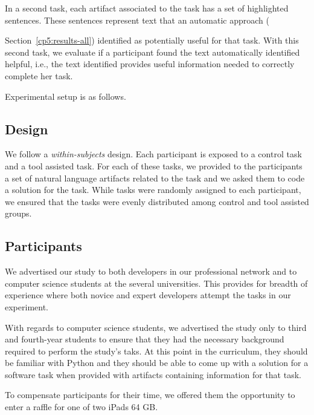 In a second task, each artifact associated to the task has a set of highlighted sentences. These 
sentences represent text that an automatic approach ({Section~\ref{cp5:results-all}) identified as potentially useful for that task. 
With this second task, we evaluate if a participant found the text automatically identified helpful, i.e., the text identified provides useful information needed to correctly complete her task.


Experimental setup is as follows.








\subsection{Design}


We follow a \textit{within-subjects} design. Each participant is exposed to a control task and a tool assisted task. For each of these tasks, we provided to the participants a set of natural language artifacts related to the task
and we asked them to code a solution for the task. While tasks were randomly assigned to each participant, 
we ensured that the tasks were evenly distributed among control and tool assisted groups. 






\subsection{Participants}



We advertised our study to both developers in our professional network and to computer science students at the several universities. 
This provides for breadth of experience where both novice and expert developers attempt the tasks in our experiment. 


With regards to computer science students, we advertised the study only to third and fourth-year students to ensure that they had the necessary background required to perform the study's taks.
At this point in the curriculum, they should be familiar with Python and they should be able to come up with a solution 
for a software task when provided with artifacts containing information for that task.


To compensate participants for their time, we offered them the opportunity to enter a raffle for one of two iPads 64 GB.




}
